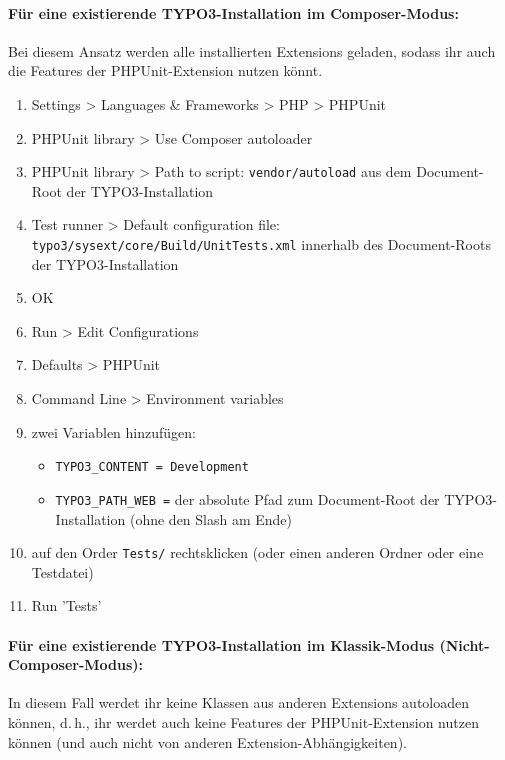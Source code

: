 \documentclass[a4paper,10pt,headsepline]{scrartcl}
\begin{document}
\paragraph{Für eine existierende TYPO3-Installation im Composer-Modus:}

Bei diesem Ansatz werden alle installierten Extensions geladen, sodass ihr auch die Features der PHPUnit-Extension nutzen könnt.

\begin{enumerate}
  \item Settings > Languages \& Frameworks > PHP > PHPUnit
  \item PHPUnit library > Use Composer autoloader
  \item PHPUnit library > Path to script: \texttt{vendor/autoload} aus dem Document-Root der TYPO3-Installation
  \item Test runner > Default configuration file: \texttt{typo3/sysext/core/Build/UnitTests.xml} innerhalb des Document-Roots der TYPO3-Installation
  \item OK
  \item Run > Edit Configurations
  \item Defaults > PHPUnit
  \item Command Line > Environment variables
  \item zwei Variablen hinzufügen:
    \begin{itemize}
      \item \texttt{TYPO3\_CONTENT = Development}
      \item \texttt{TYPO3\_PATH\_WEB =} der absolute Pfad zum Document-Root der TYPO3-Installation (ohne den Slash am Ende)
    \end{itemize}
  \item auf den Order \texttt{Tests/} rechtsklicken (oder einen anderen Ordner oder eine Testdatei)
  \item Run 'Tests'
\end{enumerate}


\paragraph{Für eine existierende TYPO3-Installation im Klassik-Modus (Nicht-Composer-Modus):}

In diesem Fall werdet ihr keine Klassen aus anderen Extensions autoloaden können, d.\,h., ihr werdet auch keine Features der PHPUnit-Extension nutzen können (und auch nicht von anderen Extension-Abhängigkeiten).
\end{document}
